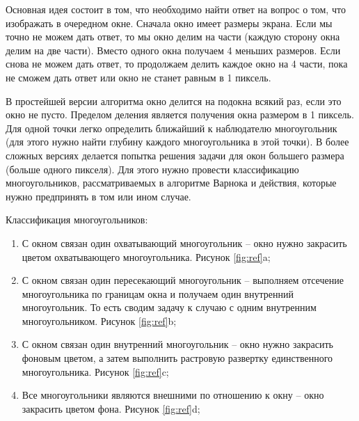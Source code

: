 Основная идея состоит в том, что необходимо найти ответ на вопрос о том, что изображать в очередном окне. Сначала окно имеет размеры экрана. Если мы точно не можем дать ответ, то мы окно делим на части (каждую сторону окна делим на две части). Вместо одного окна получаем 4 меньших размеров. Если снова не можем дать ответ, то продолжаем делить каждое окно на 4 части, пока не сможем дать ответ или окно не станет равным в 1 пиксель.

В простейшей версии алгоритма окно делится на подокна всякий раз, если это окно не пусто. Пределом деления является получения окна размером в 1 пиксель. Для одной точки легко определить ближайший к наблюдателю многоугольник (для этого нужно найти глубину каждого многоугольника в этой точки). В более сложных версиях делается попытка решения задачи для окон большего размера (больше одного пикселя). Для этого нужно провести классификацию многоугольников, рассматриваемых в алгоритме Варнока и действия, которые нужно предпринять в том или ином случае.

Классификация многоугольников:

\begin{enumerate}
	\item С окном связан один охватывающий многоугольник -- окно нужно закрасить цветом охватывающего многоугольника.  Рисунок \ref{fig:ref}a;
	\item С окном связан один пересекающий многоугольник -- выполняем отсечение многоугольника по границам окна и получаем один внутренний многоугольник. То есть сводим задачу к случаю с одним внутренним многоугольником.  Рисунок \ref{fig:ref}b;
	\item С окном связан один внутренний многоугольник -- окно нужно закрасить фоновым цветом, а затем выполнить растровую развертку единственного многоугольника. Рисунок \ref{fig:ref}c;
	\item Все многоугольники являются внешними по отношению к окну -- окно закрасить цветом фона.  Рисунок \ref{fig:ref}d;
\end{enumerate}

\begin{figure}[ht!]
\end{figure}

